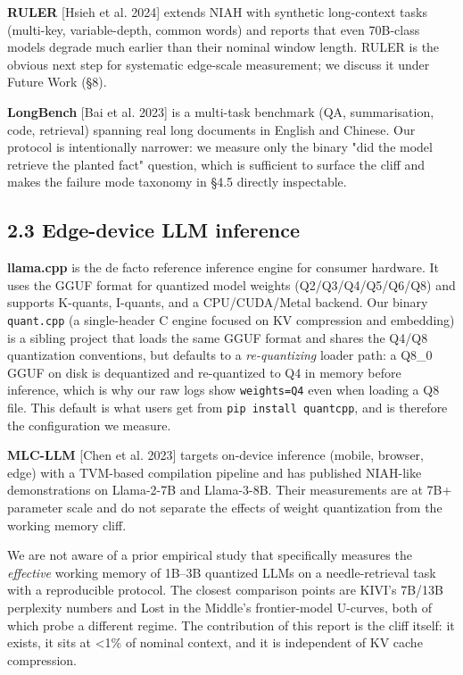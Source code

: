 \documentclass[11pt]{article}
\begin{document}
\textbf{RULER} [Hsieh et al. 2024] extends NIAH with synthetic long-context tasks (multi-key, variable-depth, common words) and reports that even 70B-class models degrade much earlier than their nominal window length. RULER is the obvious next step for systematic edge-scale measurement; we discuss it under Future Work (§8).


\textbf{LongBench} [Bai et al. 2023] is a multi-task benchmark (QA, summarisation, code, retrieval) spanning real long documents in English and Chinese. Our protocol is intentionally narrower: we measure only the binary "did the model retrieve the planted fact" question, which is sufficient to surface the cliff and makes the failure mode taxonomy in §4.5 directly inspectable.


\subsection*{2.3 Edge-device LLM inference}


\textbf{llama.cpp} is the de facto reference inference engine for consumer hardware. It uses the GGUF format for quantized model weights (Q2/Q3/Q4/Q5/Q6/Q8) and supports K-quants, I-quants, and a CPU/CUDA/Metal backend. Our binary \texttt{quant.cpp} (a single-header C engine focused on KV compression and embedding) is a sibling project that loads the same GGUF format and shares the Q4/Q8 quantization conventions, but defaults to a \textit{re-quantizing} loader path: a Q8\_0 GGUF on disk is dequantized and re-quantized to Q4 in memory before inference, which is why our raw logs show \texttt{weights=Q4} even when loading a Q8 file. This default is what users get from \texttt{pip install quantcpp}, and is therefore the configuration we measure.


\textbf{MLC-LLM} [Chen et al. 2023] targets on-device inference (mobile, browser, edge) with a TVM-based compilation pipeline and has published NIAH-like demonstrations on Llama-2-7B and Llama-3-8B. Their measurements are at 7B+ parameter scale and do not separate the effects of weight quantization from the working memory cliff.


We are not aware of a prior empirical study that specifically measures the \textit{effective} working memory of 1B–3B quantized LLMs on a needle-retrieval task with a reproducible protocol. The closest comparison points are KIVI's 7B/13B perplexity numbers and Lost in the Middle's frontier-model U-curves, both of which probe a different regime. The contribution of this report is the cliff itself: it exists, it sits at <1\% of nominal context, and it is independent of KV cache compression.
\end{document}
